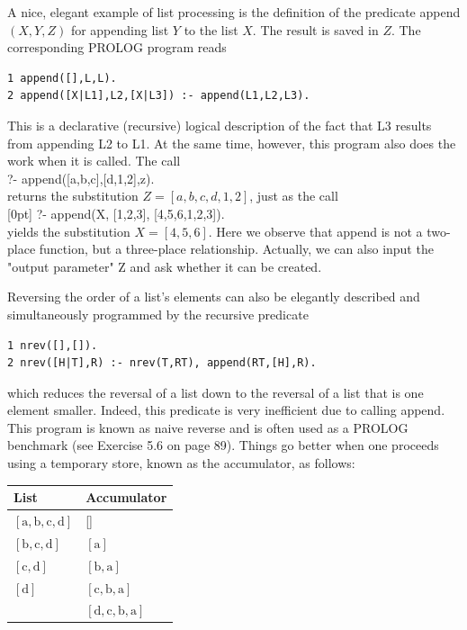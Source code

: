 \documentclass[10pt]{article}
\begin{document}
A nice, elegant example of list processing is the definition of the predicate append $(X, Y, Z)$ for appending list $Y$ to the list $X$. The result is saved in $Z$. The corresponding PROLOG program reads

\begin{verbatim}
1 append([],L,L).
2 append([X|L1],L2,[X|L3]) :- append(L1,L2,L3).
\end{verbatim}

This is a declarative (recursive) logical description of the fact that L3 results from appending L2 to L1. At the same time, however, this program also does the work when it is called. The call\\[0pt]
?- append([a,b,c],[d,1,2],z).\\
returns the substitution $Z=[a, b, c, d, 1,2]$, just as the call\\
[0pt]
?- append(X, [1,2,3], [4,5,6,1,2,3]).\\
yields the substitution $X=[4,5,6]$. Here we observe that append is not a two-place function, but a three-place relationship. Actually, we can also input the "output parameter" Z and ask whether it can be created.

Reversing the order of a list's elements can also be elegantly described and simultaneously programmed by the recursive predicate

\begin{verbatim}
1 nrev([],[]).
2 nrev([H|T],R) :- nrev(T,RT), append(RT,[H],R).
\end{verbatim}

which reduces the reversal of a list down to the reversal of a list that is one element smaller. Indeed, this predicate is very inefficient due to calling append. This program is known as naive reverse and is often used as a PROLOG benchmark (see Exercise 5.6 on page 89). Things go better when one proceeds using a temporary store, known as the accumulator, as follows:

\begin{center}
\begin{tabular}{ll}
\hline
List & Accumulator \\
\hline
$[\mathrm{a}, \mathrm{b}, \mathrm{c}, \mathrm{d}]$ & [] \\
\hline
$[\mathrm{b}, \mathrm{c}, \mathrm{d}]$ & $[\mathrm{a}]$ \\
\hline
$[\mathrm{c}, \mathrm{d}]$ & $[\mathrm{b}, \mathrm{a}]$ \\
\hline
$[\mathrm{d}]$ & $[\mathrm{c}, \mathrm{b}, \mathrm{a}]$ \\
\hline
[] & $[\mathrm{d}, \mathrm{c}, \mathrm{b}, \mathrm{a}]$ \\
\hline
\end{tabular}
\end{center}
\end{document}
